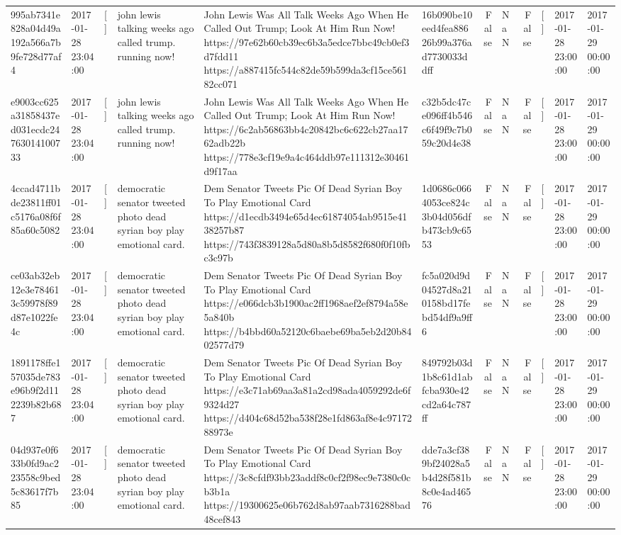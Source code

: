 \begin{tabular}{llllllrlrlll}
995ab7341e828a04d49a192a566a7b9fe728d77af4 & 2017-01-28 23:04:00 & [] & john lewis talking weeks ago called trump. running now! & John Lewis Was All Talk Weeks Ago When He Called Out Trump; Look At Him Run Now! https://97e62b60cb39ec6b3a5edce7bbc49cb0ef3d7fdd11 https://a887415fc544c82de59b599da3cf15ce56182cc071 & 16b090be10eed4fea88626b99a376ad7730033ddff & False & NaN & False & [] & 2017-01-28 23:00:00 & 2017-01-29 00:00:00 \\
e9003cc625a31858437ed031ecdc24763014100733 & 2017-01-28 23:04:00 & [] & john lewis talking weeks ago called trump. running now! & John Lewis Was All Talk Weeks Ago When He Called Out Trump; Look At Him Run Now! https://6c2ab56863bb4c20842bc6c622cb27aa1762adb22b https://778e3cf19e9a4c464ddb97e111312e30461d9f17aa & c32b5dc47ce096ff4b546c6f49f9c7b059c20d4e38 & False & NaN & False & [] & 2017-01-28 23:00:00 & 2017-01-29 00:00:00 \\
4ccad4711bde23811ff01c5176a08f6f85a60c5082 & 2017-01-28 23:04:00 & [] & democratic senator tweeted photo dead syrian boy play emotional card. & Dem Senator Tweets Pic Of Dead Syrian Boy To Play Emotional Card https://d1ecdb3494e65d4ec61874054ab9515e4138257b87 https://743f3839128a5d80a8b5d8582f680f0f10fbc3c97b & 1d0686c0664053ce824c3b04d056dfb473cb9c6553 & False & NaN & False & [] & 2017-01-28 23:00:00 & 2017-01-29 00:00:00 \\
ce03ab32eb12e3e784613c59978f89d87e1022fe4c & 2017-01-28 23:04:00 & [] & democratic senator tweeted photo dead syrian boy play emotional card. & Dem Senator Tweets Pic Of Dead Syrian Boy To Play Emotional Card https://e066dcb3b1900ac2ff1968aef2ef8794a58e5a840b https://b4bbd60a52120c6baebe69ba5eb2d20b8402577d79 & fc5a020d9d04527d8a210158bd17febd54df9a9ff6 & False & NaN & False & [] & 2017-01-28 23:00:00 & 2017-01-29 00:00:00 \\
1891178ffe157035de783e96b9f2d112239b82b687 & 2017-01-28 23:04:00 & [] & democratic senator tweeted photo dead syrian boy play emotional card. & Dem Senator Tweets Pic Of Dead Syrian Boy To Play Emotional Card https://e3c71ab69aa3a81a2cd98ada4059292de6f9324d27 https://d404c68d52ba538f28e1fd863af8e4c9717288973e & 849792b03d1b8c61d1abfcba930e42cd2a64c787ff & False & NaN & False & [] & 2017-01-28 23:00:00 & 2017-01-29 00:00:00 \\
04d937e0f633b0fd9ac223558c9bed5c83617f7b85 & 2017-01-28 23:04:00 & [] & democratic senator tweeted photo dead syrian boy play emotional card. & Dem Senator Tweets Pic Of Dead Syrian Boy To Play Emotional Card https://3c8cfdf93bb23addf8c0cf2f98ec9e7380c0cb3b1a https://19300625e06b762d8ab97aab7316288bad48cef843 & dde7a3cf389bf24028a5b4d28f581b8c0e4ad46576 & False & NaN & False & [] & 2017-01-28 23:00:00 & 2017-01-29 00:00:00 \\

\end{tabular}
